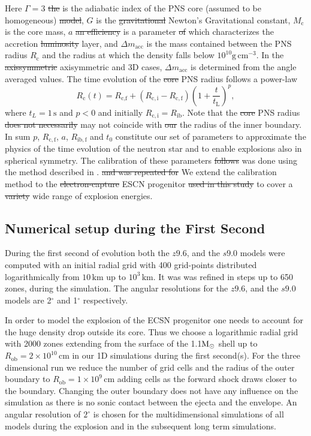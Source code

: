 \documentclass[fleqn,usenatbib]{mnras}
\newcommand{\solm}{\xspace\ensuremath{\rm{M_{\odot}}}\xspace}
\newcommand{\km}{\ensuremath{\mathrm{km}}\xspace}
\newcommand{\gcc}{\text{g}\, \text{cm}^{-3}}
\newcommand{\NY}[2]{{\color{blue}\sout{#1}#2}}
\begin{document}
Here $\Gamma = 3$ \NY{the}{ is} the adiabatic index of the \NY{}{PNS} core \NY{}{(\NY{}{assumed to be homogeneous})} \NY{model}{}, $G$ \NY{}{is} the \NY{gravitational}{ Newton's Gravitational} constant, $M_{\mathrm{c}}$ \NY{}{is} the core mass, $a$ \NY{an efficiency}{ is a} parameter \NY{of}{ which characterizes} the accretion \NY{luminosity}{ layer,} and $\Delta m_{\mathrm{acc}}$ \NY{}{is} the mass contained between the PNS radius $R_\mathrm{c}$ and the radius at which the density falls below $10^{10}\gcc$. In the \NY{axissymmetric}{ axisymmetric} and 3D cases\NY{}{,} $\Delta m_{\mathrm{acc}}$ is determined from the angle averaged values.
The time evolution of the \NY{core}{ PNS} radius follows a power-law 
\begin{equation}
    R_{\mathrm{c}}(t) =R_{\text{c,f}} + (R_{\mathrm{c,i}} - R_{\mathrm{c,f}}) \left(1+\frac{t}{t_{\text{L}}}  \right)^p,
\end{equation}
where $t_L = 1 \, \text{s}$ and $p < 0$ and  initially $R_{\mathrm{c,i}} = R_{\mathrm{ib}}$. Note that the \NY{core}{ PNS} radius \NY{does not necessarily}{ may not} coincide with \NY{our}{ the radius of the} inner boundary. In sum $p$, $R_{\mathrm{c,f}}$, $a$, $R_{\mathrm{ib,f}}$ and $t_0$ constitute our set of parameters to approximate the physics of the time evolution of the neutron star and to enable explosions also in spherical symmetry.
The calibration of these parameters \NY{follows}{ was done using the method described in} \citet{Ertl2016}\NY{}{.} \NY{and was repeated for}{ We extend the calibration method to} the \NY{electron-capture}{ ESCN} progenitor \NY{used in this study}{} to cover a \NY{variety}{ wide range} of explosion energies.

\subsection{Numerical setup during the First Second}
During the first second of evolution both the $z9.6$, and the $s9.0$ models were computed with an initial radial grid with 400 grid-points distributed logarithmically from $10\,\km$ up to $10^{3}\, \km$. It was was refined in steps up to 650 zones, during the simulation. The angular resolutions for the $z9.6$, and the $s9.0$ models are 2$^\circ$ and 1$^\circ$ respectively. 

In order to model the explosion of the ECSN progenitor one needs to account for the huge density drop outside its core. Thus we choose a logarithmic radial grid with 2000 zones extending from the surface of the 1.1\solm shell up to $R_{\mathrm{ob}}=2\times 10^{10}\,\mathrm{cm}$ in our 1D simulations during the first second(s). 
For the three dimensional run we reduce the number of grid cells and the radius of the outer boundary to $R_{\mathrm{ob}}=1\times 10^{9}\,\mathrm{cm}$ adding cells as the forward shock draws closer to the boundary.
Changing the outer boundary does not have any influence on the simulation as there is no sonic contact between the ejecta and the envelope.  
An angular resolution of $2^{\circ}$ is chosen for the multidimensional simulations of all models during the explosion and in the subsequent long term simulations.
\end{document}
